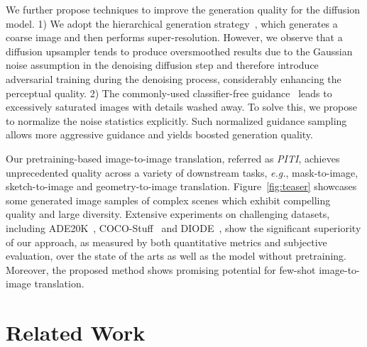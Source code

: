We further propose techniques to improve the generation quality for the diffusion model. 1) We adopt the hierarchical generation strategy~\cite{ho2022cascaded,nichol2021glide,ramesh2022hierarchical}, which generates a coarse image and then performs super-resolution. However, we observe that a diffusion upsampler tends to produce oversmoothed results due to the Gaussian noise assumption in the denoising diffusion step and therefore introduce adversarial training during the denoising process, considerably enhancing the perceptual quality. 2) The commonly-used classifier-free guidance~\cite{ho2021classifier} leads to excessively saturated images with details washed away. To solve this, we propose to normalize the noise statistics explicitly. Such normalized guidance sampling allows more aggressive guidance and yields boosted generation quality.

Our {{p}retraining-based {i}mage-{t}o-{i}mage translation}, referred as \emph{PITI}, achieves unprecedented quality across a variety of downstream tasks, \textit{e.g.}\@, mask-to-image, sketch-to-image and geometry-to-image translation. Figure~\ref{fig:teaser} showcases some generated image samples of complex scenes which exhibit compelling quality and large diversity. Extensive experiments on challenging datasets, including ADE20K~\cite{zhou2017scene}, COCO-Stuff~\cite{caesar2018coco} and DIODE~\cite{vasiljevic2019diode}, show the significant superiority of our approach, as measured by both quantitative metrics and subjective evaluation, over the state of the arts as well as the model without pretraining. Moreover, the proposed method shows promising potential for few-shot image-to-image translation.

\section{Related Work}
